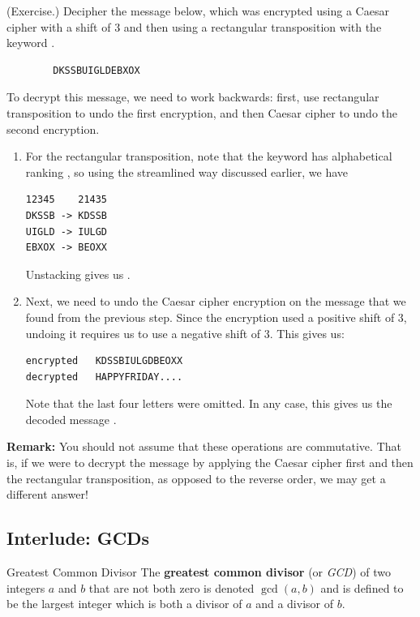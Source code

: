 \documentclass[letterpaper]{article}
\begin{document}
\begin{mdframed}
    (Exercise.) Decipher the message below, which was encrypted using a Caesar cipher with a shift of 3 and then using a rectangular transposition with the keyword .
    \begin{verbatim}
        DKSSBUIGLDEBXOX\end{verbatim}

    \begin{mdframed}
        To decrypt this message, we need to work backwards: first, use rectangular transposition to undo the first encryption, and then Caesar cipher to undo the second encryption.
        \begin{enumerate}
            \item For the rectangular transposition, note that the keyword has alphabetical ranking , so using the streamlined way discussed earlier, we have 
            \begin{mdframed}
                \begin{verbatim}
12345    21435
DKSSB -> KDSSB
UIGLD -> IULGD
EBXOX -> BEOXX\end{verbatim}
            \end{mdframed}
            Unstacking gives us .

            \item Next, we need to undo the Caesar cipher encryption on the message that we found from the previous step. Since the encryption used a positive shift of 3, undoing it requires us to use a negative shift of 3. This gives us: 
            \begin{mdframed}
                \begin{verbatim}
encrypted   KDSSBIULGDBEOXX
decrypted   HAPPYFRIDAY....\end{verbatim}
            \end{mdframed}
            Note that the last four letters were omitted. In any case, this gives us the decoded message .
        \end{enumerate}
    \end{mdframed}
\end{mdframed}
\textbf{Remark:} You should not assume that these operations are commutative. That is, if we were to decrypt the message by applying the Caesar cipher first and then the rectangular transposition, as opposed to the reverse order, we may get a different answer!


\subsection{Interlude: GCDs}
\begin{definition}{Greatest Common Divisor}{}
    The \textbf{greatest common divisor} (or \emph{GCD}) of two integers $a$ and $b$ that are not both zero is denoted $\gcd(a, b)$ and is defined to be the largest integer which is both a divisor of $a$ and a divisor of $b$.
\end{definition}
\end{document}
